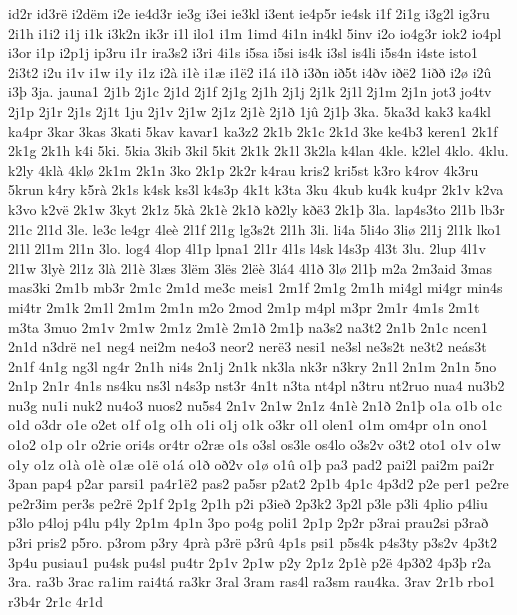 {id2r
id3r^^eb
i2d^^ebm
i2e
ie4d3r
ie3g
i3ei
ie3kl
i3ent
ie4p5r
ie4sk
i1f
2i1g
i3g2l
ig3ru
2i1h
i1i2
i1j
i1k
i3k2n
ik3r
i1l
ilo1
i1m
1imd
4i1n
in4kl
5inv
i2o
io4g3r
iok2
io4pl
i3or
i1p
i2p1j
ip3ru
i1r
ira3s2
i3ri
4i1s
i5sa
i5si
is4k
i3sl
is4li
i5s4n
i4ste
isto1
2i3t2
i2u
i1v
i1w
i1y
i1z
i2^^e0
i1^^e8
i1^^e6
i1^^eb2
i1^^e1
i1^^f0
i3^^f0n
i^^f05t
i4^^f0v
i^^f0^^eb2
1i^^f0^^f0
i2^^f8
i2^^fb
i3^^fe
3ja.
jauna1
2j1b
2j1c
2j1d
2j1f
2j1g
2j1h
2j1j
2j1k
2j1l
2j1m
2j1n
jot3
jo4tv
2j1p
2j1r
2j1s
2j1t
1ju
2j1v
2j1w
2j1z
2j1^^e8
2j1^^f0
1j^^fb
2j1^^fe
3ka.
5ka3d
kak3
ka4kl
ka4pr
3kar
3kas
3kati
5kav
kavar1
ka3z2
2k1b
2k1c
2k1d
3ke
ke4b3
keren1
2k1f
2k1g
2k1h
k4i
5ki.
5kia
3kib
3kil
5kit
2k1k
2k1l
3k2la
k4lan
4kle.
k2lel
4klo.
4klu.
k2ly
4kl^^e0
4kl^^f8
2k1m
2k1n
3ko
2k1p
2k2r
k4rau
kris2
kri5st
k3ro
k4rov
4k3ru
5krun
k4ry
k5r^^e0
2k1s
k4sk
ks3l
k4s3p
4k1t
k3ta
3ku
4kub
ku4k
ku4pr
2k1v
k2va
k3vo
k2v^^eb
2k1w
3kyt
2k1z
5k^^e0
2k1^^e8
2k1^^f0
k^^f02ly
k^^f0^^eb3
2k1^^fe
3la.
lap4s3to
2l1b
lb3r
2l1c
2l1d
3le.
le3c
le4gr
4le^^e8
2l1f
2l1g
lg3s2t
2l1h
3li.
li4a
5li4o
3li^^f8
2l1j
2l1k
lko1
2l1l
2l1m
2l1n
3lo.
log4
4lop
4l1p
lpna1
2l1r
4l1s
l4sk
l4s3p
4l3t
3lu.
2lup
4l1v
2l1w
3ly^^e8
2l1z
3l^^e0
2l1^^e8
3l^^e6s
3l^^ebm
3l^^ebs
2l^^eb^^e8
3l^^e14
4l1^^f0
3l^^f8
2l1^^fe
m2a
2m3aid
3mas
mas3ki
2m1b
mb3r
2m1c
2m1d
me3c
meis1
2m1f
2m1g
2m1h
mi4gl
mi4gr
min4s
mi4tr
2m1k
2m1l
2m1m
2m1n
m2o
2mod
2m1p
m4pl
m3pr
2m1r
4m1s
2m1t
m3ta
3muo
2m1v
2m1w
2m1z
2m1^^e8
2m1^^f0
2m1^^fe
na3s2
na3t2
2n1b
2n1c
ncen1
2n1d
n3dr^^eb
ne1
neg4
nei2m
ne4o3
neor2
ner^^eb3
nesi1
ne3sl
ne3s2t
ne3t2
ne^^e1s3t
2n1f
4n1g
ng3l
ng4r
2n1h
ni4s
2n1j
2n1k
nk3la
nk3r
n3kry
2n1l
2n1m
2n1n
5no
2n1p
2n1r
4n1s
ns4ku
ns3l
n4s3p
nst3r
4n1t
n3ta
nt4pl
n3tru
nt2ruo
nua4
nu3b2
nu3g
nu1i
nuk2
nu4o3
nuos2
nu5s4
2n1v
2n1w
2n1z
4n1^^e8
2n1^^f0
2n1^^fe
o1a
o1b
o1c
o1d
o3dr
o1e
o2et
o1f
o1g
o1h
o1i
o1j
o1k
o3kr
o1l
olen1
o1m
om4pr
o1n
ono1
o1o2
o1p
o1r
o2rie
ori4s
or4tr
o2r^^e6
o1s
o3sl
os3le
os4lo
o3s2v
o3t2
oto1
o1v
o1w
o1y
o1z
o1^^e0
o1^^e8
o1^^e6
o1^^eb
o1^^e1
o1^^f0
o^^f02v
o1^^f8
o1^^fb
o1^^fe
pa3
pad2
pai2l
pai2m
pai2r
3pan
pap4
p2ar
parsi1
pa4r1^^eb2
pas2
pa5sr
p2at2
2p1b
4p1c
4p3d2
p2e
per1
pe2re
pe2r3im
per3s
pe2r^^eb
2p1f
2p1g
2p1h
p2i
p3ie^^f0
2p3k2
3p2l
p3le
p3li
4plio
p4liu
p3lo
p4loj
p4lu
p4ly
2p1m
4p1n
3po
po4g
poli1
2p1p
2p2r
p3rai
prau2si
p3ra^^f0
p3ri
pris2
p5ro.
p3rom
p3ry
4pr^^e0
p3r^^eb
p3r^^fb
4p1s
psi1
p5s4k
p4s3ty
p3s2v
4p3t2
3p4u
pusiau1
pu4sk
pu4sl
pu4tr
2p1v
2p1w
p2y
2p1z
2p1^^e8
p2^^eb
4p3^^f02
4p3^^fe
r2a
3ra.
ra3b
3rac
ra1im
rai4t^^e1
ra3kr
3ral
3ram
ras4l
ra3sm
rau4ka.
3rav
2r1b
rbo1
r3b4r
2r1c
4r1d
}

